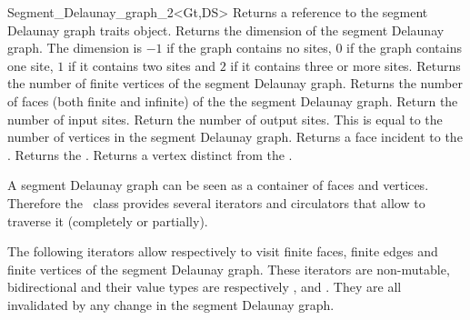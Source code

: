 \begin{ccRefClass}{Segment_Delaunay_graph_2<Gt,DS>}
\ccAccessFunctions
%
{Returns a reference to the segment Delaunay graph traits object.}
\ccGlue
{}
{Returns the dimension of the segment Delaunay graph. The dimension
  is $-1$ if the graph contains no sites, $0$ if the graph
  contains one site, $1$ if it contains two sites and $2$ if it
  contains three or more sites.}
\ccGlue
{}
{Returns the number of finite vertices of the segment Delaunay graph.}
\ccGlue
{}
{Returns the number of faces (both finite and infinite) of the the
  segment Delaunay graph.}
\ccGlue
{}
{Return the number of input sites.}
\ccGlue
{}
{Return the number of output sites. This is equal to the number of
vertices in the segment Delaunay graph.}
\ccGlue
{}
{Returns a face incident to the .}
\ccGlue
{}
{Returns the .}
\ccGlue
{}
{Returns a vertex distinct from  the .
}
\ccGlue
{}
\ccGlue
{}
\ccGlue
{}




A segment Delaunay graph can be seen as a container of faces and
vertices. Therefore the \ccRefName\ class provides several iterators
and circulators that allow to traverse it (completely or partially).





The following iterators allow respectively to visit finite faces,
finite edges and  finite vertices of the segment Delaunay graph. These
iterators are non-mutable, bidirectional and their value types are
respectively ,  and . 
They are all invalidated by any change in the segment Delaunay graph.


\end{ccRefClass}
